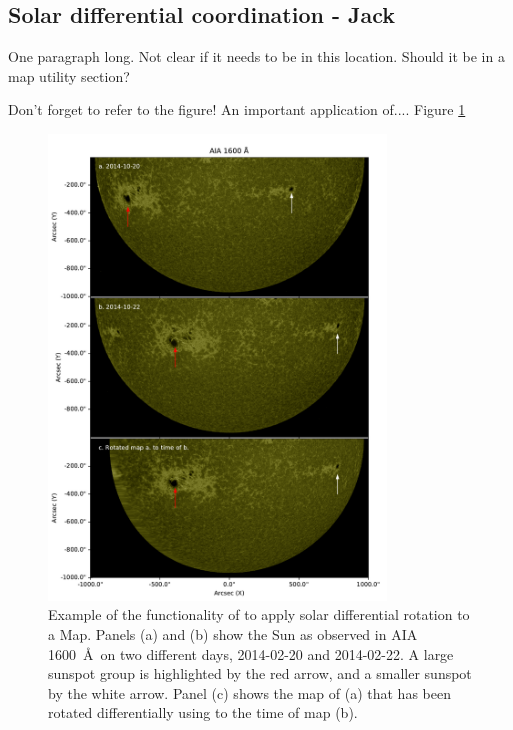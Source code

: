 \subsection{Solar differential coordination - Jack}

One paragraph long.
Not clear if it needs to be in this location.
Should it be in a map utility section?

Don't forget to refer to the figure!
An important application of....
Figure \ref{fig:diff_rot}


\begin{figure}
    \center
    \includegraphics[width = 0.8\textwidth]{figures/diff_rot_1600.pdf}
    \caption{Example of the functionality of \sunpy to apply solar differential rotation to a Map.
    Panels (a) and (b) show the Sun as observed in AIA 1600~\AA\ on two different days, 2014-02-20 and 2014-02-22.
    A large sunspot group is highlighted by the red arrow, and a smaller sunspot by the white arrow.
    Panel (c) shows the map of (a) that has been rotated differentially using \sunpy to the time of map (b).}
    \label{fig:diff_rot}
\end{figure}
